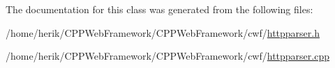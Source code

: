 The documentation for this class was generated from the following files\+:\begin{DoxyCompactItemize}
\item 
/home/herik/\+C\+P\+P\+Web\+Framework/\+C\+P\+P\+Web\+Framework/cwf/\hyperlink{httpparser_8h}{httpparser.\+h}\item 
/home/herik/\+C\+P\+P\+Web\+Framework/\+C\+P\+P\+Web\+Framework/cwf/\hyperlink{httpparser_8cpp}{httpparser.\+cpp}\end{DoxyCompactItemize}
